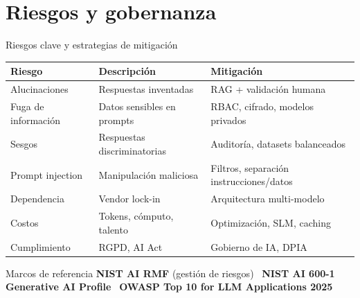 \documentclass[10pt,aspectratio=169]{beamer}
\begin{document}
\section{Riesgos y gobernanza}
\begin{frame}{Riesgos clave y estrategias de mitigación}
    \small
    \begin{center}
    \begin{tabular}{p{3.5cm} p{5cm} p{5cm}}
        \toprule
        \textbf{Riesgo} & \textbf{Descripción} & \textbf{Mitigación} \\
        \midrule
        Alucinaciones & Respuestas inventadas & RAG + validación humana \\
        Fuga de información & Datos sensibles en prompts & RBAC, cifrado, modelos privados \\
        Sesgos & Respuestas discriminatorias & Auditoría, datasets balanceados \\
        Prompt injection & Manipulación maliciosa & Filtros, separación instrucciones/datos \\
        Dependencia & Vendor lock-in & Arquitectura multi-modelo \\
        Costos & Tokens, cómputo, talento & Optimización, SLM, caching \\
        Cumplimiento & RGPD, AI Act & Gobierno de IA, DPIA \\
        \bottomrule
    \end{tabular}
    \end{center}
    \vspace{0.3cm}
    \begin{alertblock}{Marcos de referencia}
        \centering \textbf{NIST AI RMF} (gestión de riesgos) \textperiodcentered\ \textbf{NIST AI 600-1 Generative AI Profile} \textperiodcentered\ \textbf{OWASP Top 10 for LLM Applications 2025}
    \end{alertblock}
\end{frame}

\end{document}
